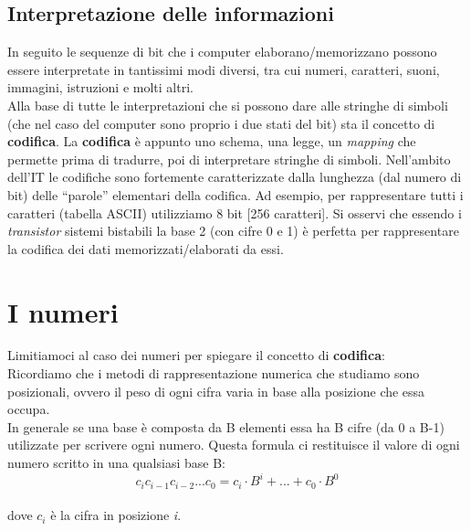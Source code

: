 \documentclass[class=book, crop=false]{standalone}
\begin{document}
\subsection{Interpretazione delle informazioni} In seguito le sequenze di bit che i computer elaborano/memorizzano possono essere interpretate in tantissimi modi diversi, tra cui numeri, caratteri, suoni, immagini, istruzioni e molti altri.\\
Alla base di tutte le interpretazioni che si possono dare alle stringhe di simboli (che nel caso del computer sono proprio i due stati del bit) sta il concetto di \textbf{codifica}. La \textbf{codifica} è appunto uno schema, una legge, un \emph{mapping} che permette prima di tradurre, poi di interpretare stringhe di simboli.
Nell’ambito dell’IT le codifiche sono fortemente caratterizzate dalla lunghezza (dal numero di bit) delle “parole” elementari della codifica. Ad esempio, per rappresentare tutti i caratteri (tabella ASCII) utilizziamo  8 bit [256 caratteri].
Si osservi che essendo i \emph{transistor} sistemi bistabili la base 2 (con cifre 0 e 1) è perfetta per rappresentare la codifica dei dati memorizzati/elaborati da essi.
\section{I numeri}
Limitiamoci al caso dei numeri per spiegare il concetto di \textbf{codifica}:\\
Ricordiamo che i  metodi di rappresentazione numerica che studiamo sono posizionali, ovvero il peso di ogni cifra varia in base alla posizione che essa  occupa.\\
In generale se una base è composta da B elementi essa ha B cifre (da 0 a B-1) utilizzate per scrivere ogni numero.
Questa formula ci restituisce il valore di ogni numero scritto in una qualsiasi base B:\\
\[c_{i} c_{i-1} c_{i-2}... c_{0}=c_{i}\cdot B^{i}+...+c_{0}\cdot B^{0}\]\\
dove $c_{i}$ è la cifra in posizione \emph{i}.
\end{document}
